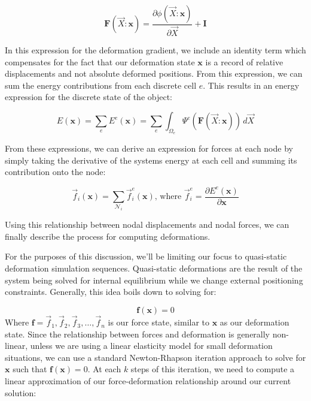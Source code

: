 \begin{equation}
  \label{equ:discretedeformationgradient}
  \mathbf F(\vec{X}:\mathbf x) = \frac{ \partial \phi(\vec{X}:\mathbf x)
  }{\partial \vec{X}} + \mathbf I
\end{equation}

In this expression for the deformation gradient, we include an
identity term which compensates for the fact that our deformation
state $\mathbf x$ is a record of relative displacements and not
absolute deformed positions.  From this expression, we can sum the
energy contributions from each discrete cell $e$. This results in an
energy expression for the discrete state of the object:

\begin{equation}
  \label{equ:discreteenergy}
  E(\mathbf x) = \sum_e E^e(\mathbf x) = \sum_e \int_{\Omega_{e}}\Psi^e( \mathbf F(\vec{X}:\mathbf x) ) \,d \vec{X}
\end{equation}

From these expressions, we can derive an expression for forces at each
node by simply taking the derivative of the systems energy at each
cell and summing its contribution onto the node:

\begin{equation}
  \label{equ:discreteforces}
  \vec{f}_i(\mathbf x) = \sum_{\mathcal N_i} \vec{f}_i^e(\mathbf x)
  \text{, where } \vec{f}_i^e = \frac{\partial E^e(\mathbf x)}{\partial \mathbf x}
\end{equation}

Using this relationship between nodal displacements and nodal forces,
we can finally describe the process for computing deformations.

For the purposes of this discussion, we'll be limiting our focus to
quasi-static deformation simulation sequences. Quasi-static deformations are the
result of the system being solved for internal equilibrium while we
change external positioning constraints. Generally, this idea boils
down to solving for:

$$
\mathbf f(\mathbf x) = 0
$$
Where
$\mathbf f = {\vec{f}_1, \vec{f}_2, \vec{f}_3, \ldots, \vec{f}_n}$ is
our force state, similar to $\mathbf x$ as our deformation state.
Since the relationship between forces and deformation is generally
non-linear, unless we are using a linear elasticity model for small
deformation situations, we can use a standard Newton-Rhapson iteration
approach to solve for $\mathbf x$ such that $\mathbf f(\mathbf x) =
0$. At each $k$ steps of this iteration, we need to compute a linear
approximation of our force-deformation relationship around our current
solution:

